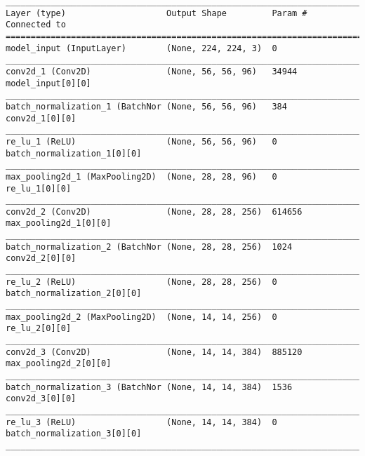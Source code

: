 \begin{lstlisting}[caption={AlexNet \ac{VAE} Encoder},captionpos=b,basicstyle=\tiny, label={lst:alexnet-vae-encoder}]
__________________________________________________________________________________________________
Layer (type)                    Output Shape         Param #     Connected to
==================================================================================================
model_input (InputLayer)        (None, 224, 224, 3)  0
__________________________________________________________________________________________________
conv2d_1 (Conv2D)               (None, 56, 56, 96)   34944       model_input[0][0]
__________________________________________________________________________________________________
batch_normalization_1 (BatchNor (None, 56, 56, 96)   384         conv2d_1[0][0]
__________________________________________________________________________________________________
re_lu_1 (ReLU)                  (None, 56, 56, 96)   0           batch_normalization_1[0][0]
__________________________________________________________________________________________________
max_pooling2d_1 (MaxPooling2D)  (None, 28, 28, 96)   0           re_lu_1[0][0]
__________________________________________________________________________________________________
conv2d_2 (Conv2D)               (None, 28, 28, 256)  614656      max_pooling2d_1[0][0]
__________________________________________________________________________________________________
batch_normalization_2 (BatchNor (None, 28, 28, 256)  1024        conv2d_2[0][0]
__________________________________________________________________________________________________
re_lu_2 (ReLU)                  (None, 28, 28, 256)  0           batch_normalization_2[0][0]
__________________________________________________________________________________________________
max_pooling2d_2 (MaxPooling2D)  (None, 14, 14, 256)  0           re_lu_2[0][0]
__________________________________________________________________________________________________
conv2d_3 (Conv2D)               (None, 14, 14, 384)  885120      max_pooling2d_2[0][0]
__________________________________________________________________________________________________
batch_normalization_3 (BatchNor (None, 14, 14, 384)  1536        conv2d_3[0][0]
__________________________________________________________________________________________________
re_lu_3 (ReLU)                  (None, 14, 14, 384)  0           batch_normalization_3[0][0]
__________________________________________________________________________________________________

\end{lstlisting}
